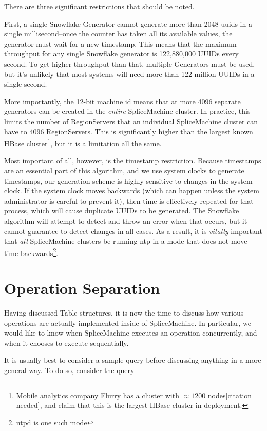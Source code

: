 There are three significant restrictions that should be noted.

First, a single Snowflake Generator cannot generate more than 2048 uuids in a single millisecond--once the counter has taken all its available values, the generator must wait for a new timestamp. This means that the maximum throughput for any single Snowflake generator is 122,880,000 UUIDs every second. To get higher throughput than that, multiple Generators must be used, but it's unlikely that most systems will need more than 122 million UUIDs in a single second.

More importantly, the 12-bit machine id means that at more 4096 separate generators can be created in the \emph{entire} SpliceMachine cluster. In practice, this limits the number of RegionServers that an individual SpliceMachine cluster can have to 4096 RegionServers. This is significantly higher than the largest known HBase cluster\footnote{Mobile analytics company Flurry has a cluster with $\approx 1200$ nodes[citation needed], and claim that this is the largest HBase cluster in deployment.}, but it is a limitation all the same.

Most important of all, however, is the timestamp restriction. Because timestamps are an essential part of this algorithm, and we use system clocks to generate timestamps, our generation scheme is highly sensitive to changes in the system clock. If the system clock moves backwards (which can happen unless the system administrator is careful to prevent it), then time is effectively repeated for that process, which will cause duplicate UUIDs to be generated. The Snowflake algorithm will attempt to detect and throw an error when that occurs, but it cannot guarantee to detect changes in all cases. As a result, it is \emph{vitally} important that \emph{all} SpliceMachine clusters be running ntp in a mode that does not move time backwards\footnote{ntpd is one such mode}.

\section{Operation Separation}
Having discussed Table structures, it is now the time to discuss how various operations are actually implemented inside of SpliceMachine. In particular, we would like to know when SpliceMachine executes an operation concurrently, and when it chooses to execute sequentially.

It is usually best to consider a sample query before discussing anything in a more general way. To do so, consider the query 


